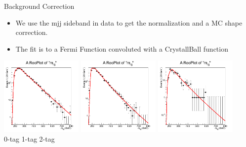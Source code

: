 \begin{frame}{Background Correction}
  \scriptsize
  \begin{itemize}
  \item
    We use the mjj sideband in data to get the normalization and a MC shape correction.

\item
  The fit is to a Fermi Function convoluted with a CrystallBall function
\end{itemize}

\begin{center}
    \includegraphics[width=0.3\textwidth]{images/fromDani/mZZ_sidebandsDATA_alpha_0btag_ALL_log.png}
    \includegraphics[width=0.3\textwidth]{images/fromDani/mZZ_sidebandsDATA_alpha_1btag_ALL_log.png}
    \includegraphics[width=0.3\textwidth]{images/fromDani/mZZ_sidebandsDATA_alpha_2btag_ALL_log.png}\\
0-tag \hspace{10.5em} 1-tag \hspace{10.5em} 2-tag
\end{center}

\end{frame}


